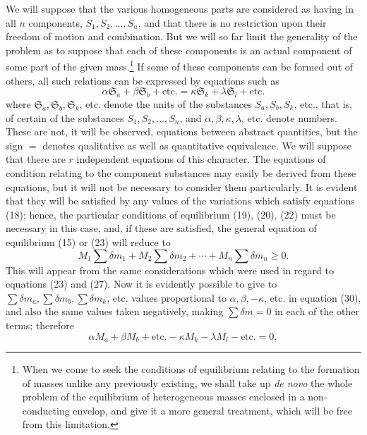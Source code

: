 \documentclass[11pt]{article}
\newcommand{\unit}[1]{\mathfrak{S}_{#1}}
\begin{document}
We will suppose that the various homogeneous parts are considered as having in all \(n\) components, \(S_1,S_2,\ldots,S_n\), and that there is no restriction upon their freedom of motion and combination. But we will so far limit the generality of the problem as to suppose that each of these components is an actual component of some part of the given mass.\footnote{When we come to seek the conditions of equilibrium relating to the formation of masses unlike any previously existing, we shall take up \textit{de novo} the whole problem of the equilibrium of heterogeneous masses enclosed in a non-conducting envelop, and give it a more general treatment, which will be free from this limitation.} If some of these components can be formed out of others, all such relations can be expressed by equations such as
\begin{equation}
\alpha\unit{a}+\beta\unit{b}+\text{etc.}
=\kappa\unit{k}+\lambda\unit{l}+\text{etc.}
\end{equation}
where \(\unit{a},\unit{b},\unit{k}\), etc. denote the units of the substances \(S_a,S_b,S_k\), etc., that is, of certain of the substances \(S_1,S_2,\ldots,S_n\), and \(\alpha,\beta,\kappa,\lambda\), etc. denote numbers. These are not, it will be observed, equations between abstract quantities, but the sign \(=\) denotes qualitative as well as quantitative equivalence. We will suppose that there are \(r\) independent equations of this character. The equations of condition relating to the component substances may easily be derived from these equations, but it will not be necessary to consider them particularly. It is evident that they will be satisfied by any values of the variations which satisfy equations (18); hence, the particular conditions of equilibrium (19), (20), (22) must be necessary in this case, and, if these are satisfied, the general equation of equilibrium (15) or (23) will reduce to
\begin{equation}
M_1\sum\delta m_1+M_2\sum\delta m_2+\cdots+M_n\sum\delta m_n\geq 0.
\end{equation}
This will appear from the same considerations which were used in regard to equations (23) and (27). Now it is evidently possible to give to \(\sum\delta m_a,\sum\delta m_b,\sum\delta m_k\), etc. values proportional to \(\alpha,\beta,-\kappa\), etc. in equation (30), and also the same values taken negatively, making \(\sum\delta m=0\) in each of the other terms; therefore
\begin{equation}
\alpha M_a+\beta M_b+\text{etc.}-\kappa M_k-\lambda M_l-\text{etc.}=0,
\end{equation}
\end{document}
